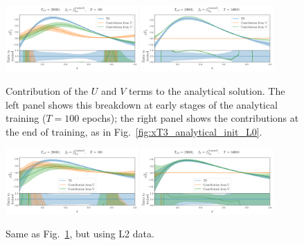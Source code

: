 \begin{figure}[h]
    \centering
    \includegraphics[width=0.45\textwidth]{plots/pdf_plot_u_v_100_L0.pdf}
    \includegraphics[width=0.45\textwidth]{plots/pdf_plot_u_v_50000_L0.pdf}
    \caption{Contribution of the $U$ and $V$ terms to the analytical solution. The left
    panel shows this breakdown at early stages of the analytical training
    ($T=100$ epochs); the right panel shows the contributions at the end of
    training, as in Fig.~\ref{fig:xT3_analytical_init_L0}.}
    \label{fig:xT3_u_v_contributions_L0}
  \end{figure}

  \begin{figure}[h]
    \centering
    \includegraphics[width=0.45\textwidth]{plots/pdf_plot_u_v_100_L2.pdf}
    \includegraphics[width=0.45\textwidth]{plots/pdf_plot_u_v_50000_L2.pdf}
    \caption{Same as Fig.~\ref{fig:xT3_u_v_contributions_L0}, but using L2 data.}
    \label{fig:xT3_u_v_contributions_L2}
  \end{figure}


\FloatBarrier

